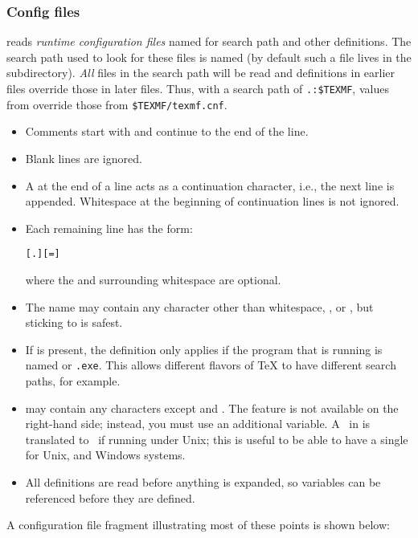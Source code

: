 \documentclass{article}
\begin{document}
\subsubsection{Config files}

\begingroup{}
\KPS{} reads \emph{runtime configuration files} named 
for search path and other definitions.  The search path used to look
for these files is named  (by default such a file lives
in the  subdirectory).  \emph{All}
 files in the search path will be read and definitions
in earlier files override those in later files.  Thus, with a search
path of \verb|.:$TEXMF|, values from  override those
from \verb|$TEXMF/texmf.cnf|.
\endgroup

\begin{itemize}
\item
  Comments start with \code{\%} and continue to the end of the line.
\item
  Blank lines are ignored.
\item
  A \bs{} at the end of a line acts as a continuation character,
  i.e., the next line is appended.  Whitespace at the beginning of
  continuation lines is not ignored.
\item
  Each remaining line has the form:
\begin{alltt}
  [.] [=] 
\end{alltt}%
  where the \samp{=} and surrounding whitespace are optional.
\item
  The  name may contain any character other
  than whitespace, \samp{=}, or , but sticking to
   is safest.
\item
  If  is present, the definition only
  applies if the program that is running is named
  \texttt{} or \texttt{.exe}.  This allows
  different flavors of \TeX{} to have different search paths, for
  example.
\item {} may contain any characters except
  \code{\%} and .  The
   feature is not available on the
  right-hand side; instead, you must use an additional variable.  A
  \samp{;}\ in  is translated to \samp{:}\ if
  running under Unix; this is useful to be able to have a single
   for Unix,  and Windows systems.
\item
  All definitions are read before anything is expanded, so
  variables can be referenced before they are defined.
\end{itemize}
A configuration file fragment illustrating most of these points is
\ifSingleColumn
shown below:
\end{document}
